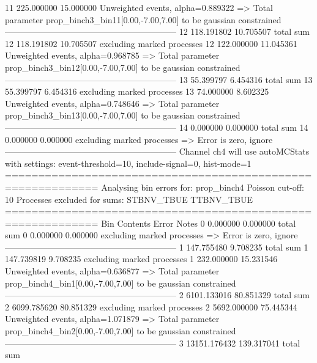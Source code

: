 11         225.000000      15.000000       Unweighted events, alpha=0.889322
  => Total parameter prop_binch3_bin11[0.00,-7.00,7.00] to be gaussian constrained
------------------------------------------------------------
12         118.191802      10.705507       total sum                     
12         118.191802      10.705507       excluding marked processes    
12         122.000000      11.045361       Unweighted events, alpha=0.968785
  => Total parameter prop_binch3_bin12[0.00,-7.00,7.00] to be gaussian constrained
------------------------------------------------------------
13         55.399797       6.454316        total sum                     
13         55.399797       6.454316        excluding marked processes    
13         74.000000       8.602325        Unweighted events, alpha=0.748646
  => Total parameter prop_binch3_bin13[0.00,-7.00,7.00] to be gaussian constrained
------------------------------------------------------------
14         0.000000        0.000000        total sum                     
14         0.000000        0.000000        excluding marked processes    
  => Error is zero, ignore      
------------------------------------------------------------
Channel ch4 will use autoMCStats with settings: event-threshold=10, include-signal=0, hist-mode=1
============================================================
Analysing bin errors for: prop_binch4
Poisson cut-off: 10
Processes excluded for sums: STBNV_TBUE TTBNV_TBUE
============================================================
Bin        Contents        Error           Notes                         
0          0.000000        0.000000        total sum                     
0          0.000000        0.000000        excluding marked processes    
  => Error is zero, ignore      
------------------------------------------------------------
1          147.755480      9.708235        total sum                     
1          147.739819      9.708235        excluding marked processes    
1          232.000000      15.231546       Unweighted events, alpha=0.636877
  => Total parameter prop_binch4_bin1[0.00,-7.00,7.00] to be gaussian constrained
------------------------------------------------------------
2          6101.133016     80.851329       total sum                     
2          6099.785620     80.851329       excluding marked processes    
2          5692.000000     75.445344       Unweighted events, alpha=1.071879
  => Total parameter prop_binch4_bin2[0.00,-7.00,7.00] to be gaussian constrained
------------------------------------------------------------
3          13151.176432    139.317041      total sum                     
